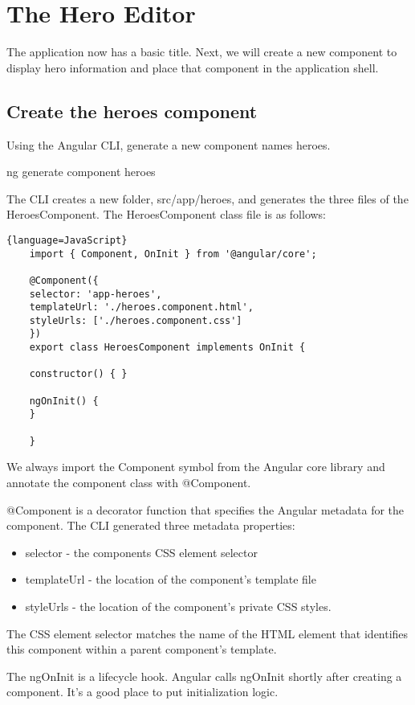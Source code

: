 \chapter{The Hero Editor}
The application now has a basic title. Next, we will create a new component to display hero information and place that component in the application shell.

\section{Create the heroes component}
Using the Angular CLI, generate a new component names heroes.

ng generate component heroes

The CLI creates a new folder, src/app/heroes, and generates the three files of the HeroesComponent. The HeroesComponent class file is as follows:

\begin{lstlisting}{language=JavaScript}
    import { Component, OnInit } from '@angular/core';

    @Component({
    selector: 'app-heroes',
    templateUrl: './heroes.component.html',
    styleUrls: ['./heroes.component.css']
    })
    export class HeroesComponent implements OnInit {

    constructor() { }

    ngOnInit() {
    }

    }

\end{lstlisting}

We always import the Component symbol from the Angular core library and annotate the component class with @Component.

@Component is a decorator function that specifies the Angular metadata for the component.
The CLI generated three metadata properties:
\begin{itemize}
    \item selector - the components CSS element selector
    \item templateUrl - the location of the component's template file
    \item styleUrls - the location of the component's private CSS styles.
\end{itemize}

The CSS element selector matches the name of the HTML element that identifies this component within a parent component's template.

The ngOnInit is a lifecycle hook. Angular calls ngOnInit shortly after creating a component. It's a good place to put initialization logic.


